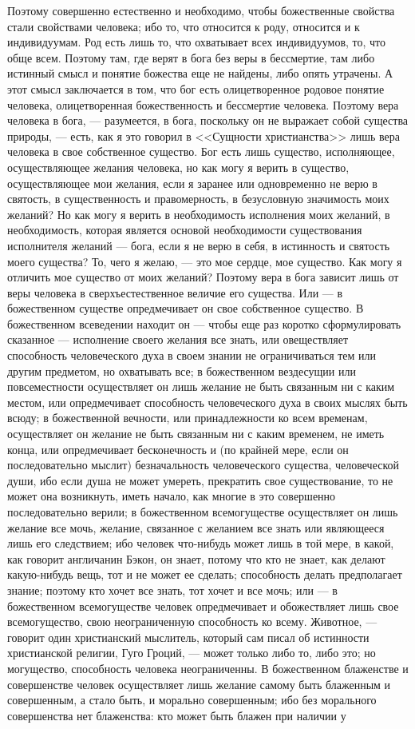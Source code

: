 \documentclass[12pt]{article}
\begin{document}
Поэтому совершенно естественно и необходимо, чтобы божественные свойства стали свойствами человека; ибо то, что относится к роду, относится и к индивидуумам. Род есть лишь то, что охватывает всех индивидуумов, то, что обще всем. Поэтому там, где верят в бога без веры в бессмертие, там либо истинный смысл и понятие божества еще не найдены, либо опять утрачены. А этот смысл заключается в том, что бог есть олицетворенное родовое понятие человека, олицетворенная божественность и бессмертие человека. Поэтому вера человека в бога, --- разумеется, в бога, поскольку он не выражает собой существа природы, --- есть, как я это говорил в <<Сущности христианства>>  лишь вера человека в свое собственное существо. Бог есть лишь существо, исполняющее, осуществляющее желания человека, но как могу я верить в существо, осуществляющее мои желания, если я заранее или одновременно не верю в святость, в существенность и правомерность, в безусловную значимость моих желаний? Но как могу я верить в необходимость исполнения моих желаний, в необходимость, которая является основой необходимости существования исполнителя желаний --- бога, если я не верю в себя, в истинность и святость моего существа? То, чего я желаю, --- это мое сердце, мое существо. Как могу я отличить мое существо от моих желаний? Поэтому вера в бога зависит лишь от веры человека в сверхъестественное величие его существа. Или --- в божественном существе опредмечивает он свое собственное существо. В божественном всеведении находит он --- чтобы еще раз коротко сформулировать сказанное --- исполнение своего желания все знать, или овеществляет способность человеческого духа в своем знании не ограничиваться тем или другим предметом, но охватывать все; в божественном вездесущии или повсеместности осуществляет он лишь желание не быть связанным ни с каким местом, или опредмечивает способность человеческого духа в своих мыслях быть всюду; в божественной вечности, или принадлежности ко всем временам, осуществляет он желание не быть связанным ни с каким временем, не иметь конца, или опредмечивает бесконечность и (по крайней мере, если он последовательно мыслит) безначальность человеческого существа, человеческой души, ибо если душа не может умереть, прекратить свое существование, то не может она возникнуть, иметь начало, как многие в это совершенно последовательно верили; в божественном всемогуществе осуществляет он лишь желание все мочь, желание, связанное с желанием все знать или являющееся лишь его следствием; ибо человек что-нибудь может лишь в той мере, в какой, как говорит англичанин Бэкон, он знает, потому что кто не знает, как делают какую-нибудь вещь, тот и не может ее сделать; способность делать предполагает знание; поэтому кто хочет все знать, тот хочет и все мочь; или --- в божественном всемогуществе человек опредмечивает и обожествляет лишь свое всемогущество, свою неограниченную способность ко всему. Животное, --- говорит один христианский мыслитель, который сам писал об истинности христианской религии, Гуго Гроций, --- может только либо то, либо это; но могущество, способность человека неограниченны. В божественном блаженстве и совершенстве человек осуществляет лишь желание самому быть блаженным и совершенным, а стало быть, и морально совершенным; ибо без морального совершенства нет блаженства: кто может быть блажен при наличии у 
\end{document}
